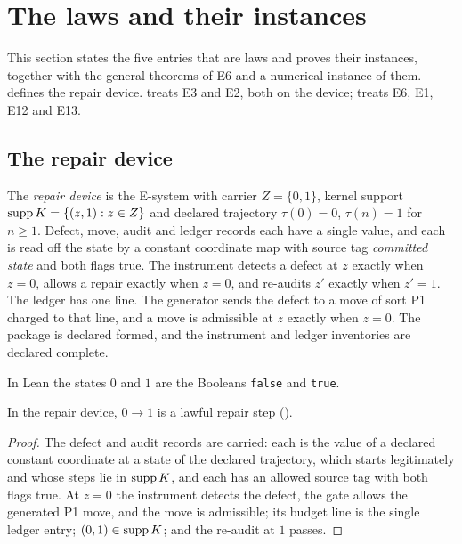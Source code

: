 \section{The laws and their instances}\label{sec:concrete}

This section states the five entries that are laws and proves their instances, together with the
general theorems of E6 and a numerical instance of them. 
defines the repair device.  treats E3 and  E2, both on the
device;  treats E6,  E1,  E12 and
 E13.

\subsection{The repair device}\label{sec:device}

\begin{definition}\label{def:device}
The \emph{repair device} is the E-system with carrier $Z = \{0, 1\}$, kernel support
$\operatorname{supp} K = \{(z, 1) : z \in Z\}$ and declared trajectory $\tau(0) = 0$, $\tau(n) = 1$ for $n \ge 1$.
Defect, move, audit and ledger records each have a single value, and each is read off the state by
a constant coordinate map with source tag \emph{committed state} and both flags true. The instrument
detects a defect at $z$ exactly when $z = 0$, allows a repair exactly when $z = 0$, and re-audits
$z'$ exactly when $z' = 1$. The ledger has one line. The generator sends the defect to a move of
sort P1 charged to that line, and a move is admissible at $z$ exactly when $z = 0$. The package is
declared formed, and the instrument and ledger inventories are declared complete.
\end{definition}

In Lean the states $0$ and $1$ are the Booleans \texttt{false} and \texttt{true}.

\begin{proposition}\label{prop:device-step}
In the repair device, $0 \to 1$ is a lawful repair step ().
\end{proposition}

\begin{proof}
The defect and audit records are carried: each is the value of a declared constant coordinate at a
state of the declared trajectory, which starts legitimately and whose steps lie in $\operatorname{supp} K$, and
each has an allowed source tag with both flags true. At $z = 0$ the instrument detects the defect,
the gate allows the generated P1 move, and the move is admissible; its budget line is the single
ledger entry; $(0, 1) \in \operatorname{supp} K$; and the re-audit at $1$ passes.
\end{proof}

